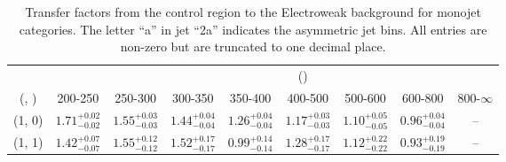 \begin{table}[h!]
\tiny
\centering
\caption{Transfer factors from the \mj control region to the Electroweak background for monojet categories. The letter ``a'' in jet \eg ``2a''  indicates the asymmetric jet bins. All entries are non-zero but are truncated to one decimal place.\label{tab:tf_mu_total_mono}}
\begin{tabular}
{ccccccccc}
	\hline\hline
&	& \multicolumn{8}{c}{\scalht (\gev)} \\ 
	 (\njet,  \nb) & 200-250 & 250-300 & 300-350 & 350-400 & 400-500 & 500-600 & 600-800 & 800-$\infty$ \\ [0.8ex] 
\hline
	(1, 0) & $1.71^{+ 0.02 }_{- 0.02 }$ & $1.55^{+ 0.03 }_{- 0.03 }$ & $1.44^{+ 0.04 }_{- 0.04 }$ & $1.26^{+ 0.04 }_{- 0.04 }$ & $1.17^{+ 0.03 }_{- 0.03 }$ & $1.10^{+ 0.05 }_{- 0.05 }$ & $0.96^{+ 0.04 }_{- 0.04 }$ & -- \\[0.5ex] 
	(1, 1) & $1.42^{+ 0.07 }_{- 0.07 }$ & $1.55^{+ 0.12 }_{- 0.12 }$ & $1.52^{+ 0.17 }_{- 0.17 }$ & $0.99^{+ 0.14 }_{- 0.14 }$ & $1.28^{+ 0.17 }_{- 0.17 }$ & $1.12^{+ 0.22 }_{- 0.22 }$ & $0.93^{+ 0.19 }_{- 0.19 }$ & -- \\[0.5ex] 
	\hline
	\hline
\end{tabular}
\end{table}
